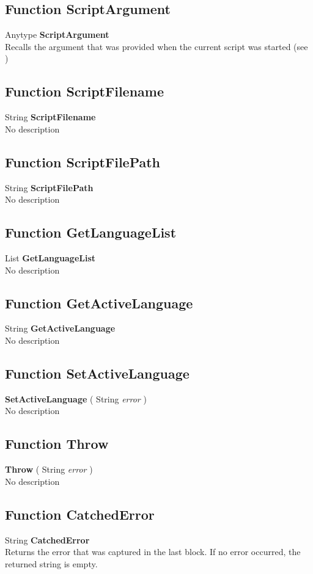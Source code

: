 \subsection{Function ScriptArgument \label{F:ScriptArgument}}
Anytype \textbf{ScriptArgument} \\
Recalls the argument that was provided when the current script was started (see )

\subsection{Function ScriptFilename \label{F:ScriptFilename}}
String \textbf{ScriptFilename} \\
No description

\subsection{Function ScriptFilePath \label{F:ScriptFilePath}}
String \textbf{ScriptFilePath} \\
No description

\subsection{Function GetLanguageList \label{F:GetLanguageList}}
List \textbf{GetLanguageList} \\
No description

\subsection{Function GetActiveLanguage \label{F:GetActiveLanguage}}
String \textbf{GetActiveLanguage} \\
No description

\subsection{Function SetActiveLanguage \label{F:SetActiveLanguage}}
\textbf{SetActiveLanguage} ( String \textit{error} ) \\
No description

\subsection{Function Throw \label{F:Throw}}
\textbf{Throw} ( String \textit{error} ) \\
No description

\subsection{Function CatchedError \label{F:CatchedError}}
String \textbf{CatchedError} \\
Returns the error that was captured in the last  block. If no error occurred, the returned string is empty.

